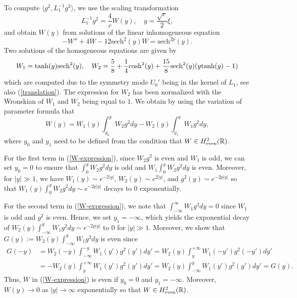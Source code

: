 \documentclass[12pt,reqno]{amsart}
\numberwithin{equation}{section}
\begin{document}
To compute $\langle g^2, L_1^{-1} g^2 \rangle$, we use the scaling transformation 
$$
L_1^{-1} g^2 = \frac{4}{c} W(y), \quad y = \frac{\sqrt{c}}{2} \xi, 
$$ 
and obtain $W(y)$ from solutions of the linear inhomogeneous equation 
\begin{equation}
\label{eq-w-2}
-W'' + 4 W -  12 \text{sech}^2(y) W = \text{sech}^{2p}(y).
\end{equation}
Two solutions of the homogeneous equations are given by 
$$
W_1 =  \tanh(y) {\rm sech}^2(y), \quad 
W_2=\frac{5}{8}+\frac{1}{4}\text{cosh}^2(y)+\frac{15}{8}{\rm sech}^2(y)(y  {\rm tanh}(y)-1)
$$
which are computed due to the symmetry mode $U_0'$ being in the kernel of $L_1$, see also (\ref{translation}). 
The expression for $W_2$ has been normalized with the Wronskian of $W_1$ and $W_2$ being equal to $1$. 
We obtain by using the variation of parameter formula that 
\begin{equation}
\label{W-expression}
W(y) = W_1(y) \int_{y_0}^{y}W_2g^2dy - W_2(y) \int_{y_1}^{y}W_1g^2dy,
\end{equation}
where $y_0$ and $y_1$ need to be defined from the condition that $W \in H^2_{\rm even}(\mathbb{R})$. 

For the first term in (\ref{W-expression}), since \(W_2 g^2\) is even and $W_1$ is odd, we can set $y_0 = 0$ to ensure that 
$\int_{0}^{y}W_2g^2dy$ is odd and $W_1 \int_{0}^{y}W_2g^2dy$ is even. Moreover, 
for $\vert y\vert \gg 1$, we have $W_1(y) \sim e^{-2\vert y\vert }$, $W_2(y) \sim e^{2\vert y\vert}$, and $g^2(y)\sim e^{-2p\vert y\vert }$ 
so that $W_1(y) \int_0^y W_2g^2 dy \sim e^{-2p\vert y\vert }$ decays to $0$ exponentially. 

For the second term in (\ref{W-expression}), we note that $\int_{-\infty}^{\infty} W_1 g^2 dy = 0$ since $W_1$ is odd and $g^2$ is even. 
Hence, we set $y_1 = -\infty$, which yields the exponential decay of $W_2(y) \int_{-\infty}^y W_1g^2 dy \sim e^{-2p\vert y\vert}$ 
to $0$ for $\vert y\vert \gg 1$. Moreover, we show that $G(y) := W_2(y) \int_{-\infty}^y W_1g^2 dy$ is even since 
\begin{align*} 
G(-y) &= W_2(-y) \int_{-\infty}^{-y} W_1(y') g^2(y') dy' = W_2(y) \int_y^{+\infty} W_1(-y') g^2(-y') d y' \\
&= - W_2(y) \int_y^{+\infty} W_1(y') g^2(y') d y' = W_2(y) \int_{-\infty}^y W_1(y') g^2(y') d y'= G(y).
\end{align*}
Thus, $W$ in (\ref{W-expression}) is even if $y_0 = 0$ and $y_1 = -\infty$. Moreover, $W(y) \to 0$ as $|y| \to \infty$ exponentially 
so that $W \in H^2_{\rm even}(\mathbb{R})$. 
\end{document}
